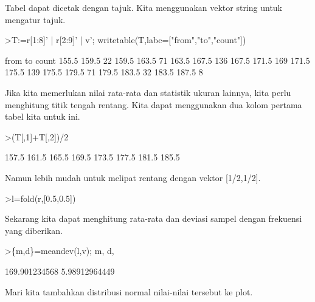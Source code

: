 \documentclass[a4paper,10pt]{article}
\begin{document}
\begin{eulernotebook}
\begin{eulercomment}
\begin{eulercomment}
\begin{eulercomment}
\begin{eulercomment}
\begin{eulercomment}
\begin{eulercomment}
\begin{eulercomment}
Tabel dapat dicetak dengan tajuk. Kita menggunakan vektor string untuk
mengatur tajuk.
\end{eulercomment}
\begin{eulerprompt}
>T:=r[1:8]' | r[2:9]' | v'; writetable(T,labc=["from","to","count"])
\end{eulerprompt}
\begin{euleroutput}
        from        to     count
       155.5     159.5        22
       159.5     163.5        71
       163.5     167.5       136
       167.5     171.5       169
       171.5     175.5       139
       175.5     179.5        71
       179.5     183.5        32
       183.5     187.5         8
\end{euleroutput}
\begin{eulercomment}
Jika kita memerlukan nilai rata-rata dan statistik ukuran lainnya,
kita perlu menghitung titik tengah rentang. Kita dapat menggunakan dua
kolom pertama tabel kita untuk ini.
\end{eulercomment}
\begin{eulerprompt}
>(T[,1]+T[,2])/2
\end{eulerprompt}
\begin{euleroutput}
                157.5 
                161.5 
                165.5 
                169.5 
                173.5 
                177.5 
                181.5 
                185.5 
\end{euleroutput}
\begin{eulercomment}
Namun lebih mudah untuk melipat rentang dengan vektor [1/2,1/2].
\end{eulercomment}
\begin{eulerprompt}
>l=fold(r,[0.5,0.5])
\end{eulerprompt}
\begin{euleroutput}
  [157.5,  161.5,  165.5,  169.5,  173.5,  177.5,  181.5,  185.5]
\end{euleroutput}
\begin{eulercomment}
Sekarang kita dapat menghitung rata-rata dan deviasi sampel dengan
frekuensi yang diberikan.
\end{eulercomment}
\begin{eulerprompt}
>\{m,d\}=meandev(l,v); m, d,
\end{eulerprompt}
\begin{euleroutput}
  169.901234568
  5.98912964449
\end{euleroutput}
\begin{eulercomment}
Mari kita tambahkan distribusi normal nilai-nilai tersebut ke plot.

\end{eulercomment}
\end{eulercomment}
\end{eulercomment}
\end{eulercomment}
\end{eulercomment}
\end{eulercomment}
\end{eulercomment}
\end{eulernotebook}
\end{document}
